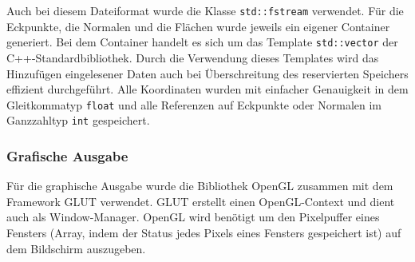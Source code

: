 \documentclass[crop=false]{standalone}
\begin{document}

        Auch bei diesem Dateiformat wurde die Klasse \texttt{std::fstream} verwendet.
        Für die Eckpunkte, die Normalen und die Flächen wurde jeweils ein eigener Container generiert.
        Bei dem Container handelt es sich um das Template \texttt{std::vector} der C++-Standardbibliothek.
        Durch die Verwendung dieses Templates wird das Hinzufügen eingelesener Daten auch bei Überschreitung des reservierten Speichers effizient durchgeführt.
        Alle Koordinaten wurden mit einfacher Genauigkeit in dem Gleitkommatyp \texttt{float} und alle Referenzen auf Eckpunkte oder Normalen im Ganzzahltyp \texttt{int} gespeichert.

      \subsubsection{Grafische Ausgabe} %
      \label{ssub:ausgabe}
        Für die graphische Ausgabe wurde die Bibliothek OpenGL zusammen mit dem Framework GLUT verwendet.
        GLUT erstellt einen OpenGL-Context und dient auch als Window-Manager.
        OpenGL wird benötigt um den Pixelpuffer eines Fensters (Array, indem der Status jedes Pixels eines Fensters gespeichert ist) auf dem Bildschirm auszugeben.
\end{document}
